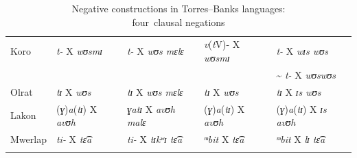 \documentclass[output=paper,colorlinks,citecolor=brown,draft]{langscibook}
\begin{document}
\begin{table}
\begin{tabularx}{\textwidth}{lXXXX}
{Koro} &  \textit{t-} X \textit{wʊsmɪ} &  \textit{t-} X \textit{wʊs mɛlɛ} &  {\textit{v}(\textit{t}V)- X \textit{wʊsmɪ}} &  \textit{t-} X \textit{wɪs wʊs}\\
&&&& {\textasciitilde} \textit{t-} X \textit{wʊswʊs}\\
{Olrat} &  \textit{tɪ} X \textit{wʊs} &  \textit{tɪ} X \textit{wʊs mɛlɛ} &  \textit{tɪ} X \textit{wʊs} &  \textit{tɪ} X \textit{ɪs wʊs}\\
{Lakon} &  (\textit{ɣ})\textit{a}(\textit{tɪ}) X \textit{avʊh} &  \textit{ɣatɪ} X \textit{avʊh malɛ} &  (\textit{ɣ})\textit{a}(\textit{tɪ}) X \textit{avʊh} &  (\textit{ɣ})\textit{a}(\textit{tɪ}) X \textit{ɪs avʊh}\\
{Mwerlap} &  \textit{ti-} X \textit{tɛ​͡a} &  \textit{ti-} X \textit{tɪkʷɪ tɛ​͡a} &  \textit{ᵐbit} X \textit{tɛ​͡a} &  \textit{ᵐbit} X \textit{lɪ tɛ​͡a}\\
\lspbottomrule
\end{tabularx}
\caption{Negative constructions in Torres–Banks languages:\\ four~clausal negations}
\label{tab:dor:clausal}
\end{table}
\end{document}
